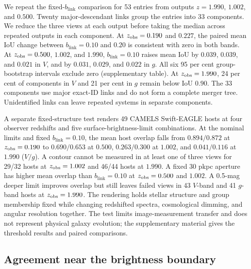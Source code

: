 \documentclass[usenatbib]{mnras}
\begin{document}
We repeat the fixed-$b_{\mathrm{link}}$ comparison for 53 entries from outputs
$z=1.990$, $1.002$, and $0.500$. Twenty major-descendant links group the entries
into 33 components. We reduce the three views at each output before taking the
median across repeated outputs in each component. At $z_{\rm obs}=0.190$ and
$0.227$, the paired mean IoU change between $b_{\mathrm{link}}=0.10$ and
$0.20$ is consistent with zero in both bands. At $z_{\rm obs}=0.500$,
$1.002$, and $1.990$, $b_{\mathrm{link}}=0.10$ raises mean IoU by
$0.039$, $0.039$, and $0.021$ in $V$, and by $0.031$, $0.029$, and $0.022$
in $g$. All six 95 per cent group-bootstrap intervals exclude zero
(supplementary table). At $z_{\rm obs}=1.990$, 24 per cent of components in
$V$ and 21 per cent in $g$ remain below IoU $0.90$. The 33 components use
major exact-ID links and do not form a complete merger tree. Unidentified
links can leave repeated systems in separate components.

A separate fixed-structure test renders 49 CAMELS Swift-EAGLE hosts at four
observer redshifts and five surface-brightness-limit combinations. At the
nominal limits and fixed $b_{\mathrm{link}}=0.10$, the mean host overlap falls from
$0.894/0.872$ at $z_{\rm obs}=0.190$ to $0.690/0.653$ at $0.500$,
$0.263/0.300$ at $1.002$, and $0.041/0.116$ at $1.990$ ($V/g$).
A contour cannot be measured in at least one of three views for 29/32 hosts
at $z_{\rm obs}=1.002$ and 46/44 hosts at $1.990$. A fixed 30 pkpc aperture
has higher mean overlap than $b_{\mathrm{link}}=0.10$ at $z_{\rm obs}=0.500$ and
$1.002$. A 0.5-mag deeper limit improves overlap but still leaves failed views
in 43 $V$-band and 41 $g$-band hosts at $z_{\rm obs}=1.990$. The rendering
holds stellar structure and group membership fixed while changing redshifted
spectra, cosmological dimming, and angular resolution together. The test
limits image-measurement transfer and does not represent physical galaxy
evolution; the supplementary material gives the threshold results and paired
comparisons.

\subsection{Agreement near the brightness boundary}
\label{sec:residual}
\end{document}
